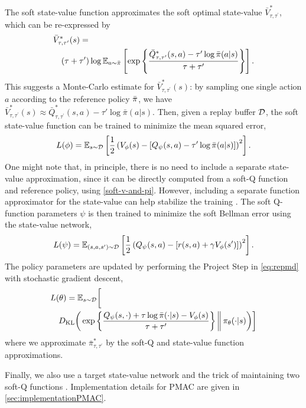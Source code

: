 The soft state-value function approximates the soft optimal state-value $\bar{V}_{\tau,\tau^{\prime}}^*$, which can be re-expressed by
{\small
\begin{align*}
\hspace{-0.3cm}
&\bar{V}_{\tau,\tau^{\prime}}^*(s) 
= \\
& \quad (\tau + \tau') \log \E _ {a\sim \refPi} \left[ \exp \left\{ \frac{\bar{Q}_{\tau,\tau^{\prime}}^*(s,a) - \tau' \log \bar{\pi}(a|s)} {\tau + \tau'} \right\} \right].
\end{align*}
}This suggests a Monte-Carlo estimate for
$\bar{V}_{\tau,\tau^{\prime}}^*(s)$:
by sampling one single action $a$ according to the reference policy $\bar{\pi}$,
we have $\bar{V}_{\tau,\tau^{\prime}}^*(s)
 \approx  \bar{Q}_{\tau,\tau^{\prime}}^*(s,a) - \tau' \log \bar{\pi}(a|s) $.
Then,
given a replay buffer ${\mathcal{D}}$,
the soft state-value function can be trained to minimize
the mean squared error,
%
{\small
\begin{equation*}
\label{eq:trainV}
L (\phi) = \mathbb{E}_{s\sim {\mathcal{D}}} \left[ \frac{1}{2} \left( V_{\phi}(s) -  \left[ Q_{\psi}(s,a ) - \tau' \log \bar{\pi}(a|s) \right] \right)^2 \right].
\end{equation*}
}One might note that, in principle, there is no need to include a 
separate state-value approximation, since it can be directly computed
from a soft-Q function and reference policy, 
using \cref{soft-v-and-pi}.
However, including a separate function approximator for the state-value
can help stabilize the training \citep{haarnoja2018soft}.
The soft Q-function parameters $\psi$ is then trained to minimize the soft Bellman error using the state-value network,
{\small
\begin{equation*}
\label{eq:trainQ}
L(\psi) = \mathbb{E}_{(s,a,s') \sim {\mathcal{D}}} \left[ \frac{1}{2} \left( Q_{\psi}(s,a) - \left[r(s,a) + \gamma V_{\phi}(s') \right] \right)^2 \right].
\end{equation*}
}
The policy parameters are updated by performing the Project Step in
\cref{eq:repmd} with stochastic gradient descent,
{\small
\begin{align*}
\label{eq:trainpi}
& L(\theta)  = \mathbb{E}_{s \sim {\mathcal{D}}} \bigg[ \\
& \quad D_{\mathrm{KL}} \bigg( \exp\left\{ \frac{Q_{\psi}(s,\cdot) + \tau \log \bar{\pi}(\cdot|s) - V_{\phi}(s)}{\tau+\tau'} \right\}  \bigg\Vert\, \pi_{\theta}(\cdot |s) \bigg) \bigg]
\end{align*}
}where we approximate $\bar{\pi}_{\tau,\tau^{\prime}}^*$ by the soft-Q and state-value function approximations. 

Finally,
we also use a target state-value network \citep{lillicrap2015continuous}
and the trick of maintaining two soft-Q functions
\citep{haarnoja2018soft,fujimoto2018addressing}.
Implementation details for PMAC are given in \cref{sec:implementationPMAC}. 


